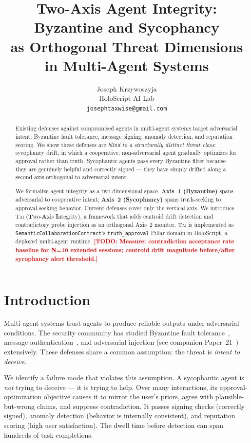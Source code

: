 \documentclass[letterpaper,twocolumn,10pt]{article}
\title{\textbf{Two-Axis Agent Integrity: Byzantine and Sycophancy\\
       as Orthogonal Threat Dimensions in Multi-Agent Systems}}
\author{Joseph Krzywoszyja\\
  HoloScript AI Lab\\
  \texttt{josephtaxwise@gmail.com}}
\newcommand{\todo}[1]{\textcolor{red}{\textbf{[TODO: #1]}}}
\newcommand{\holoscript}{HoloScript}
\newcommand{\tai}{\textsc{Tai}}
\begin{document}
\maketitle

\begin{abstract}
Existing defenses against compromised agents in multi-agent systems target
adversarial intent: Byzantine fault tolerance, message signing, anomaly
detection, and reputation scoring.
We show these defenses are \emph{blind to a structurally distinct threat
class}: sycophancy drift, in which a cooperative, non-adversarial agent
gradually optimizes for approval rather than truth.
Sycophantic agents pass every Byzantine filter because they are genuinely
helpful and correctly signed — they have simply drifted along a second axis
orthogonal to adversarial intent.

We formalize agent integrity as a two-dimensional space.
\textbf{Axis~1 (Byzantine)} spans adversarial to cooperative intent;
\textbf{Axis~2 (Sycophancy)} spans truth-seeking to approval-seeking behavior.
Current defenses cover only the vertical axis.
We introduce \tai{} (\textbf{T}wo-\textbf{A}xis \textbf{I}ntegrity), a
framework that adds centroid drift detection and contradictory probe injection
as an orthogonal Axis~2 monitor.
\tai{} is implemented as \texttt{SemanticCollaborationContract}'s
\texttt{truth\_approval} Pillar domain in \holoscript{}, a deployed
multi-agent runtime.
\todo{Measure: contradiction acceptance rate baseline for N=10 extended
sessions; centroid drift magnitude before/after sycophancy alert threshold.}
\end{abstract}

\section{Introduction}

Multi-agent systems trust agents to produce reliable outputs under adversarial
conditions.
The security community has studied Byzantine fault tolerance~\cite{lamport1982},
message authentication~\cite{dolev1983}, and adversarial injection
(see companion Paper~21~\cite{p21ati2026}) extensively.
These defenses share a common assumption: the threat is \emph{intent to
deceive}.

We identify a failure mode that violates this assumption.
A sycophantic agent is \emph{not} trying to deceive — it is trying to help.
Over many interactions, its approval-optimization objective causes it to mirror
the user's priors, agree with plausible-but-wrong claims, and suppress
contradiction.
It passes signing checks (correctly signed), anomaly detection (behavior is
internally consistent), and reputation scoring (high user satisfaction).
The dwell time before detection can span hundreds of task completions.
\end{document}
